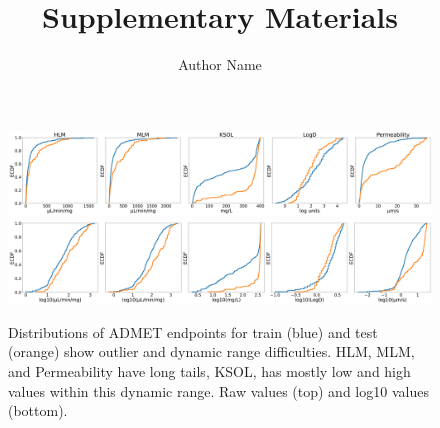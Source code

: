 \documentclass{article}
\title{Supplementary Materials}
\author{Author Name}
\begin{document}
\maketitle

\begin{figure}
    \includegraphics[scale=0.175]{04_figs_leaderboards/admet_endpoints.png}
    \includegraphics[scale=0.175]{04_figs_leaderboards/admet_endpoints_log10.png}
  \caption{Distributions of ADMET endpoints for train (blue) and test (orange) show outlier and dynamic range difficulties.  HLM, MLM, and Permeability have long tails, KSOL, has mostly low and high values within this dynamic range.  Raw values (top) and log10 values (bottom).}
  \label{fgr:admet_endpoints}
\end{figure}
\end{document}
